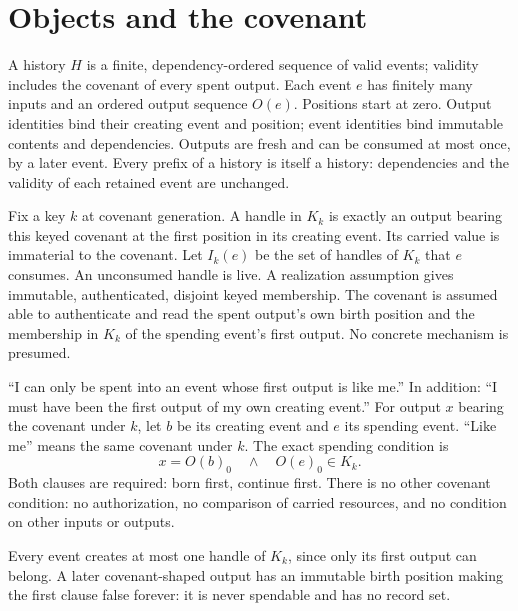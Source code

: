 \documentclass[../main.tex]{subfiles}
\begin{document}
\section{Objects and the covenant}
\label{sec:kpc:model}

\begin{definition}
\label{def:kpc-model:history}
A history $H$ is a finite, dependency-ordered sequence of valid events;
validity includes the covenant of every spent output. Each event $e$ has
finitely many inputs and an ordered output sequence $O(e)$. Positions start at zero. Output
identities bind their creating event and position; event identities bind
immutable contents and dependencies. Outputs are fresh and can be consumed
at most once, by a later event. Every prefix of a history is itself a
history: dependencies and the validity of each retained event are unchanged.
\end{definition}

\begin{definition}
\label{def:kpc-model:keyed-membership}
Fix a key $k$ at covenant generation. A handle in $K_k$ is exactly an
output bearing this keyed covenant at the first position in its creating
event. Its carried value is immaterial to the covenant.
Let $I_k(e)$ be the set of handles of $K_k$ that $e$ consumes.
An unconsumed handle is live.
A realization assumption gives immutable, authenticated, disjoint keyed
membership.
The covenant is assumed able to authenticate and read the spent output's
own birth position and the membership in $K_k$ of the spending event's
first output. No concrete mechanism is presumed.
\end{definition}

\begin{definition}
\label{def:kpc-model:first-output}
``I can only be spent into an event whose first output is like me.''
In addition: ``I must have been the first output of my own creating event.''
For output $x$ bearing the covenant under $k$, let $b$ be its creating
event and $e$ its spending event. ``Like me'' means the same covenant
under $k$. The exact spending condition is
\[
 x=O(b)_0\quad\land\quad O(e)_0\in K_k.
\]
Both clauses are required: born first, continue first. There is no other
covenant condition: no authorization, no comparison of carried resources,
and no condition on other inputs or outputs.
\end{definition}

\begin{proposition}
\label{prop:kpc-model:single-birth}
Every event creates at most one handle of $K_k$, since only its first
output can belong. A later covenant-shaped output has an immutable birth
position making the first clause false forever: it is never spendable
and has no record set.
\end{proposition}
\end{document}
